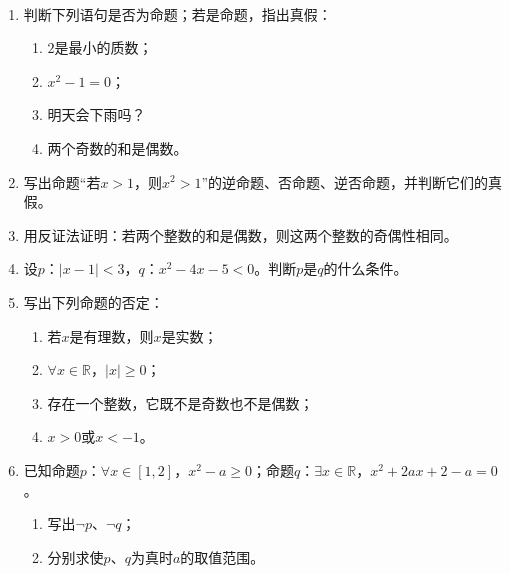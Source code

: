 \clearpage
\hw
\begin{homework}
\ 
\begin{enumerate}
    \item 判断下列语句是否为命题；若是命题，指出真假：
    \begin{enumerate}
        \item $2$是最小的质数；
        \item $x^2-1=0$；
        \item 明天会下雨吗？
        \item 两个奇数的和是偶数。
    \end{enumerate}
    \item 写出命题“若$x>1$，则$x^2>1$”的逆命题、否命题、逆否命题，并判断它们的真假。
    \item 用反证法证明：若两个整数的和是偶数，则这两个整数的奇偶性相同。
    \item 设$p$：$|x-1|<3$，$q$：$x^2-4x-5<0$。判断$p$是$q$的什么条件。
    \item 写出下列命题的否定：
    \begin{enumerate}
        \item 若$x$是有理数，则$x$是实数；
        \item $\forall x\in\mathbb{R}$，$|x|\geq 0$；
        \item 存在一个整数，它既不是奇数也不是偶数；
        \item $x>0$或$x<-1$。
    \end{enumerate}
    \item 已知命题$p$：$\forall x\in[1,2]$，$x^2-a\geq 0$；命题$q$：$\exists x\in\mathbb{R}$，$x^2+2ax+2-a=0$。
    \begin{enumerate}
        \item 写出$\neg p$、$\neg q$；
        \item 分别求使$p$、$q$为真时$a$的取值范围。
    \end{enumerate}
\end{enumerate}
\end{homework}